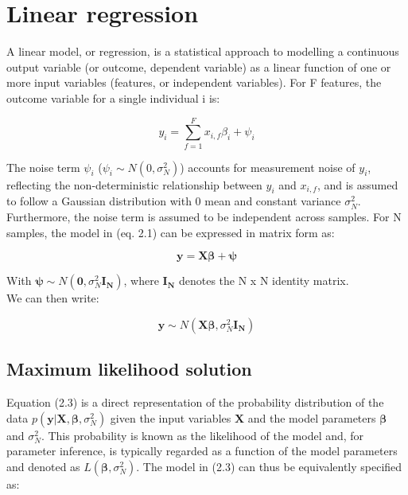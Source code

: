 
\section{Linear regression} 

A linear model, or regression, is a statistical approach to modelling a continuous output variable (or outcome, dependent variable) as a linear function of one or more input variables (features, or independent variables). For F features, the outcome variable for a single individual i is:

\begin{equation} \label{eq1:Linear_regression_sample_i}
 y_i = \sum_{f=1}^{F} x_{i,f}\beta_i + \psi_i
\end{equation}

The noise term $\psi_i$ ($ \psi_i \sim N(0, \sigma_N^2)$) accounts for measurement noise of $y_i$, reflecting the non-deterministic relationship between $y_i$ and $x_{i,f}$, and is assumed to follow a Gaussian distribution with 0 mean and constant variance $\sigma_N^2$. Furthermore, the noise term is assumed to be independent across samples. For N samples, the model in (eq. 2.1) can be expressed in matrix form as:

\begin{equation} \label{eq2:Linear_regression_matrix_form}
\mathbf{y} = \mathbf{X}\boldsymbol{\beta} + \boldsymbol{\psi} 
\end{equation}

With $ \boldsymbol{\psi} \sim N(\mathbf{0}, \sigma_N^2 \mathbf{I_N})$, where $\mathbf{I_N}$ denotes the N x N identity matrix. \\ 

We can then write:

\begin{equation} \label{eq3:Linear_regression_MVN_form}
\mathbf{y} \sim N(\mathbf{X}\mathbf{\beta}, \sigma_N^2 \mathbf{I_N}) 
\end{equation}

\newpage

\subsection{Maximum likelihood solution}

Equation (2.3) is a direct representation of the probability distribution of the data $p(\mathbf{y}| \mathbf{X}, \mathbf{\beta}, \sigma_N^2)$ given the input variables $\mathbf{X}$ and the model parameters $\boldsymbol{\beta}$ and $\sigma_N^2$.
This probability is known as the likelihood of the model and, for parameter inference, is typically regarded as a function of the model parameters and denoted as $L(\boldsymbol{\beta}, \sigma_N^2)$. 
The model in (2.3) can thus be equivalently specified as:\\

